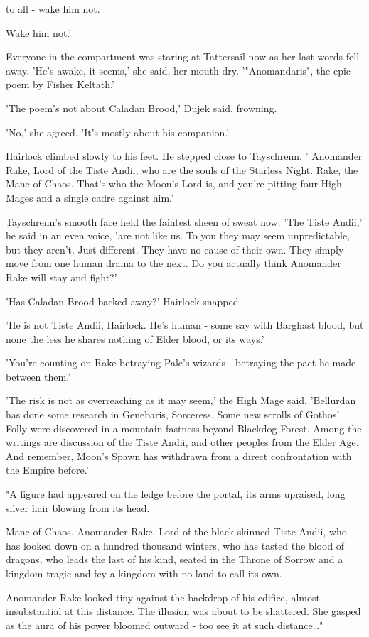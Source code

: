 {  to all - wake him not.
  
  Wake him not.'
  
  Everyone in the compartment was staring at Tattersail now as her last words fell away. 'He's awake, it seems,' she said, her mouth dry. '"Anomandaris", the epic poem by Fisher Keltath.' 
  
  'The poem's not about Caladan Brood,' Dujek said, frowning. 
  
  'No,' she agreed. 'It's mostly about his companion.'
  
  Hairlock climbed slowly to his feet. He stepped close to Tayschrenn. ' Anomander Rake, Lord of the Tiste Andii, who are the souls of the Starless Night. Rake, the Mane of Chaos. That's who the Moon's Lord is, and you're pitting four High Mages and a single cadre against him.' 
  
  Tayschrenn's smooth face held the faintest sheen of sweat now. 'The Tiste Andii,' he said in an even voice, 'are not like us. To you they may seem unpredictable, but they aren't. Just different. They have no cause of their own. They simply move from one human drama to the next. Do you actually think Anomander Rake will stay and fight?'
  
  'Has Caladan Brood backed away?' Hairlock snapped.
  
  'He is not Tiste Andii, Hairlock. He's human - some say with Barghast blood, but none the less he shares nothing of Elder blood, or its ways.' 
  
  'You're counting on Rake betraying Pale's wizards - betraying the pact he made between them.'
  
  'The risk is not as overreaching as it may seem,' the High Mage said. 'Bellurdan has done some research in Genebaris, Sorceress. Some new scrolls of Gothos' Folly were discovered in a mountain fastness beyond Blackdog Forest. Among the writings are discussion of the Tiste Andii, and other peoples from the Elder Age. And remember, Moon's Spawn has withdrawn from a direct confrontation with the Empire before.'
  
  "A figure had appeared on the ledge before the portal, its arms upraised, long silver hair blowing from its head.
  
  Mane of Chaos. 
  Anomander Rake. 
  Lord of the black-skinned Tiste Andii, 
  who has looked down on a hundred thousand winters, 
  who has tasted the blood of dragons, 
  who leads the last of his kind, 
  seated in the Throne of Sorrow 
  and a kingdom tragic and fey\dash
  a kingdom with no land to call its own.
  
  Anomander Rake looked tiny against the backdrop of his edifice, almost insubstantial at this distance. The illusion was about to be shattered. She gasped as the aura of his power bloomed outward - too see it at such distance\ldots{}"
}



